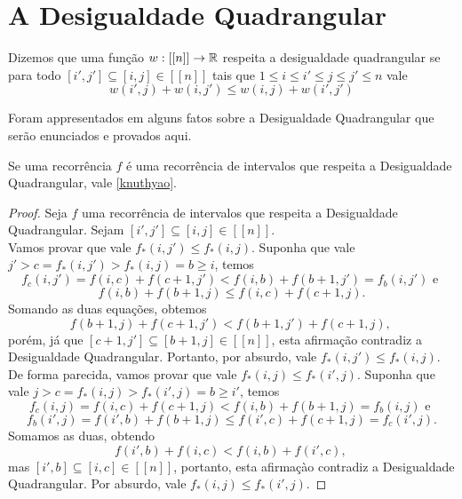 
\section{A Desigualdade Quadrangular}

\begin{defi} \label{qi}
Dizemos que uma função $w : [[n]] \to \mathbb{R}$ respeita a desigualdade quadrangular se para todo  $[i',j'] \subseteq [i,j] \in [[n]]$ tais que $1 \leq i \leq i' \leq j \leq j' \leq n$ vale
$$ w(i',j) + w(i,j') \leq w(i,j) + w(i',j') $$
\end{defi}

Foram appresentados em \cite{Yao:1980} alguns fatos sobre a Desigualdade Quadrangular que serão enunciados e provados aqui.

\begin{theo} \label{qi_to_knuthyao}
Se uma recorrência $f$ é uma recorrência de intervalos que respeita a Desigualdade Quadrangular, vale \ref{knuthyao}.
\end{theo}

\begin{proof}
Seja $f$ uma recorrência de intervalos que respeita a Desigualdade Quadrangular. Sejam $[i',j'] \subseteq [i,j] \in [[n]]$.\\
Vamos provar que vale $f_*(i,j') \leq f_*(i,j)$. Suponha que vale $j' > c = f_*(i,j') > f_*(i,j) = b \geq i$, temos
$$ f_c(i,j') = f(i,c) + f(c+1,j') < f(i,b) + f(b+1,j') = f_b(i,j') \text{ e } $$
$$ f(i,b) + f(b+1,j) \leq f(i,c) + f(c+1,j) \text{.} $$
Somando as duas equações, obtemos
$$ f(b+1,j) + f(c+1,j') < f(b+1,j') + f(c+1,j) \text{, }$$
porém, já que $[c+1,j'] \subseteq [b+1,j] \in [[n]]$, esta afirmação contradiz a Desigualdade Quadrangular. Portanto, por absurdo, vale $f_*(i,j') \leq f_*(i,j)$. \\
De forma parecida, vamos provar que vale $f_*(i,j) \leq f_*(i',j)$. Suponha que vale $j > c = f_*(i,j) > f_*(i',j) = b \geq i'$, temos
$$ f_c(i,j) = f(i,c) + f(c+1,j) < f(i,b) + f(b+1,j) = f_b(i,j) \text{ e } $$
$$ f_b(i',j) = f(i',b) + f(b+1,j) \leq f(i',c) + f(c+1,j) = f_c(i',j) \text{.} $$
Somamos as duas, obtendo
$$ f(i',b) + f(i,c) < f(i,b) + f(i',c) \text{, }$$
mas $[i',b] \subseteq [i,c] \in [[n]]$, portanto, esta afirmaçào contradiz a Desigualdade Quadrangular. Por absurdo, vale $f_*(i,j) \leq f_*(i',j)$.
\end{proof}


